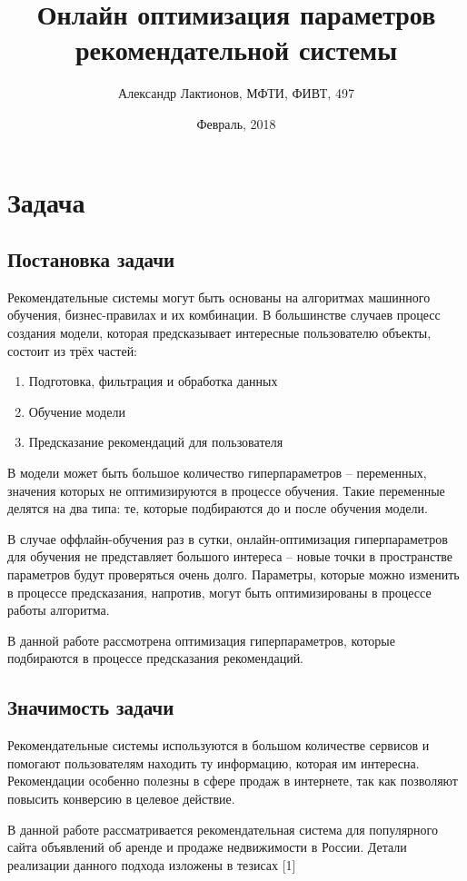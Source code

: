 \documentclass{article}
\title{Онлайн оптимизация параметров рекомендательной системы}
\author{Александр Лактионов, МФТИ, ФИВТ, 497}
\date{Февраль, 2018}
\begin{document}
 
\maketitle

\section{Задача}
\subsection{Постановка задачи}
Рекомендательные системы могут быть основаны на алгоритмах машинного обучения, бизнес-правилах и их комбинации. В большинстве случаев процесс создания модели, которая предсказывает интересные пользователю объекты, состоит из трёх частей:

\begin{enumerate}  
\item Подготовка, фильтрация и обработка данных 
\item Обучение модели
\item Предсказание рекомендаций для пользователя
\end{enumerate}

В модели может быть большое количество гиперпараметров – переменных, значения которых не оптимизируются в процессе обучения. Такие переменные делятся на два типа: те, которые подбираются до и после обучения модели. 
\par
В случае оффлайн-обучения раз в сутки, онлайн-оптимизация гиперпараметров для обучения не представляет большого интереса – новые точки в пространстве параметров будут проверяться очень долго. Параметры, которые можно изменить в процессе предсказания, напротив, могут быть оптимизированы в процессе работы алгоритма. 
\par
В данной работе рассмотрена оптимизация гиперпараметров, которые подбираются в процессе предсказания рекомендаций.
 

\subsection{Значимость задачи}
Рекомендательные системы используются в большом количестве сервисов и помогают пользователям находить ту информацию, которая им интересна. Рекомендации особенно полезны в сфере продаж в интернете, так как позволяют повысить конверсию в целевое действие. 
\par 
В данной работе рассматривается рекомендательная система для популярного сайта объявлений об аренде и продаже недвижимости в России. Детали реализации данного подхода изложены в тезисах [1]
\end{document}
